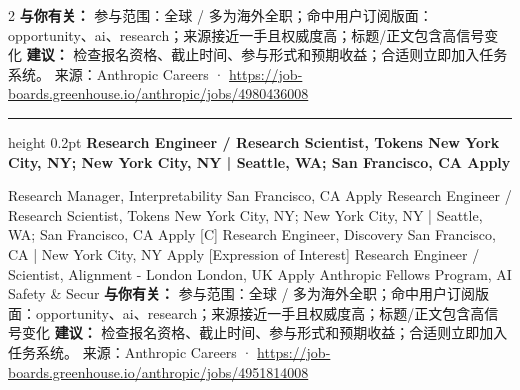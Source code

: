 \documentclass[10.5pt]{ctexart}
\begin{document}
\begin{multicols}{2}
\textbf{与你有关：} 参与范围：全球 / 多为海外全职；命中用户订阅版面：opportunity、ai、research；来源接近一手且权威度高；标题/正文包含高信号变化
\textbf{建议：} 检查报名资格、截止时间、参与形式和预期收益；合适则立即加入任务系统。
{\footnotesize\color{ormuted} 来源：Anthropic Careers · \url{https://job-boards.greenhouse.io/anthropic/jobs/4980436008}}
\vspace{2mm}
\hrule height 0.2pt
\vspace{2mm}
{\large\bfseries Research Engineer / Research Scientist, Tokens New York City, NY; New York City, NY | Seattle, WA; San Francisco, CA Apply}\par
[Expression of Interest] Research Manager, Interpretability San Francisco, CA Apply Research Engineer / Research Scientist, Tokens New York City, NY; New York City, NY | Seattle, WA; San Francisco, CA Apply [C] Research Engineer, Discovery San Francisco, CA | New York City, NY Apply [Expression of Interest] Research Engineer / Scientist, Alignment - London London, UK Apply Anthropic Fellows Program, AI Safety \& Secur
\textbf{与你有关：} 参与范围：全球 / 多为海外全职；命中用户订阅版面：opportunity、ai、research；来源接近一手且权威度高；标题/正文包含高信号变化
\textbf{建议：} 检查报名资格、截止时间、参与形式和预期收益；合适则立即加入任务系统。
{\footnotesize\color{ormuted} 来源：Anthropic Careers · \url{https://job-boards.greenhouse.io/anthropic/jobs/4951814008}}
\end{multicols}
\end{document}
